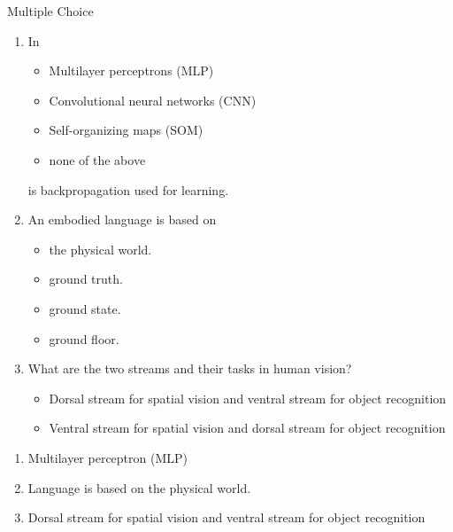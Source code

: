 \documentclass{article}
\begin{document}
\begin{exercise}{Multiple Choice}
  \begin{enumerate}
    \item In
          \begin{itemize}
            \item Multilayer perceptrons (MLP)
            \item Convolutional neural networks (CNN)
            \item Self-organizing maps (SOM)
            \item none of the above
          \end{itemize}
          is backpropagation used for learning.

    \item An embodied language is based on
          \begin{itemize}
            \item the physical world.
            \item ground truth.
            \item ground state.
            \item ground floor.
          \end{itemize}

    \item What are the two streams and their tasks in human vision?
          \begin{itemize}
            \item Dorsal stream for spatial vision and ventral stream for object recognition
            \item Ventral stream for spatial vision and dorsal stream for object recognition
          \end{itemize}
  \end{enumerate}

  \begin{solution}
    \begin{enumerate}
      \item Multilayer perceptron (MLP)
      \item Language is based on the physical world.
      \item Dorsal stream for spatial vision and ventral stream for object recognition
    \end{enumerate}
  \end{solution}
\end{exercise}
\end{document}
